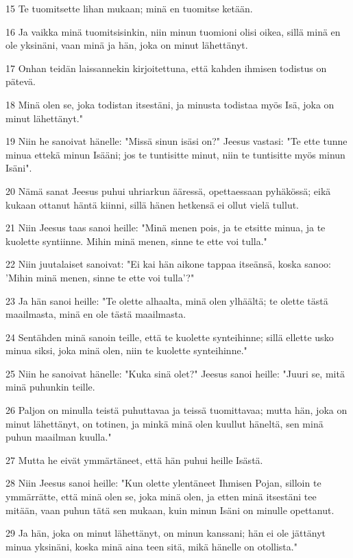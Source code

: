 \par 15 Te tuomitsette lihan mukaan; minä en tuomitse ketään.
\par 16 Ja vaikka minä tuomitsisinkin, niin minun tuomioni olisi oikea, sillä minä en ole yksinäni, vaan minä ja hän, joka on minut lähettänyt.
\par 17 Onhan teidän laissannekin kirjoitettuna, että kahden ihmisen todistus on pätevä.
\par 18 Minä olen se, joka todistan itsestäni, ja minusta todistaa myös Isä, joka on minut lähettänyt."
\par 19 Niin he sanoivat hänelle: "Missä sinun isäsi on?" Jeesus vastasi: "Te ette tunne minua ettekä minun Isääni; jos te tuntisitte minut, niin te tuntisitte myös minun Isäni".
\par 20 Nämä sanat Jeesus puhui uhriarkun ääressä, opettaessaan pyhäkössä; eikä kukaan ottanut häntä kiinni, sillä hänen hetkensä ei ollut vielä tullut.
\par 21 Niin Jeesus taas sanoi heille: "Minä menen pois, ja te etsitte minua, ja te kuolette syntiinne. Mihin minä menen, sinne te ette voi tulla."
\par 22 Niin juutalaiset sanoivat: "Ei kai hän aikone tappaa itseänsä, koska sanoo: 'Mihin minä menen, sinne te ette voi tulla'?"
\par 23 Ja hän sanoi heille: "Te olette alhaalta, minä olen ylhäältä; te olette tästä maailmasta, minä en ole tästä maailmasta.
\par 24 Sentähden minä sanoin teille, että te kuolette synteihinne; sillä ellette usko minua siksi, joka minä olen, niin te kuolette synteihinne."
\par 25 Niin he sanoivat hänelle: "Kuka sinä olet?" Jeesus sanoi heille: "Juuri se, mitä minä puhunkin teille.
\par 26 Paljon on minulla teistä puhuttavaa ja teissä tuomittavaa; mutta hän, joka on minut lähettänyt, on totinen, ja minkä minä olen kuullut häneltä, sen minä puhun maailman kuulla."
\par 27 Mutta he eivät ymmärtäneet, että hän puhui heille Isästä.
\par 28 Niin Jeesus sanoi heille: "Kun olette ylentäneet Ihmisen Pojan, silloin te ymmärrätte, että minä olen se, joka minä olen, ja etten minä itsestäni tee mitään, vaan puhun tätä sen mukaan, kuin minun Isäni on minulle opettanut.
\par 29 Ja hän, joka on minut lähettänyt, on minun kanssani; hän ei ole jättänyt minua yksinäni, koska minä aina teen sitä, mikä hänelle on otollista."
